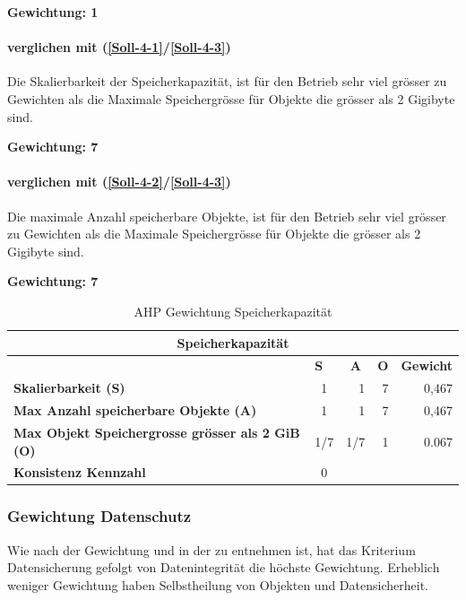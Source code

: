\textbf{Gewichtung: 1}

\paragraph*{ verglichen mit  (\ref{Soll-4-1}/\ref{Soll-4-3})}
Die Skalierbarkeit der Speicherkapazität, ist für den Betrieb sehr viel grösser zu Gewichten als die Maximale Speichergrösse für Objekte die grösser als 2 Gigibyte sind.

\textbf{Gewichtung: 7}

\paragraph*{ verglichen mit  (\ref{Soll-4-2}/\ref{Soll-4-3})}
Die maximale Anzahl speicherbare Objekte, ist für den Betrieb sehr viel grösser zu Gewichten als die Maximale Speichergrösse für Objekte die grösser als 2 Gigibyte sind.

\textbf{Gewichtung: 7}

\begin{table}[htbp]
\caption{AHP Gewichtung Speicherkapazität}
\begin{tabular}{|l|c|c|c|l|}
\hline
\multicolumn{ 5}{|c|}{\textbf{Speicherkapazität}} \\ \hline
 & \multicolumn{1}{l|}{\textbf{S}} & \textbf{A} & \textbf{O} & \textbf{Gewicht} \\ \hline
\textbf{Skalierbarkeit (S)} & 1 & \multicolumn{1}{r|}{1} & \multicolumn{1}{r|}{7} & \multicolumn{1}{r|}{0,467} \\ \hline
\textbf{Max Anzahl speicherbare Objekte (A)} & 1 & \multicolumn{1}{r|}{1} & \multicolumn{1}{r|}{7} & \multicolumn{1}{r|}{0,467} \\ \hline
\textbf{Max Objekt Speichergrosse grösser als 2 GiB (O)} & 1/7 & \multicolumn{1}{r|}{1/7} & \multicolumn{1}{r|}{1} & \multicolumn{1}{r|}{0.067} \\ \hline
\textbf{Konsistenz Kennzahl} & 0   \\ \cline{1-2}
\end{tabular}
\label{tab:AHPSpeicherkapazität}
\end{table}

\subsubsection{Gewichtung Datenschutz}

Wie nach der Gewichtung und in der  zu entnehmen ist, hat das Kriterium Datensicherung gefolgt von Datenintegrität die höchste Gewichtung. Erheblich weniger Gewichtung haben Selbstheilung von Objekten und Datensicherheit.

